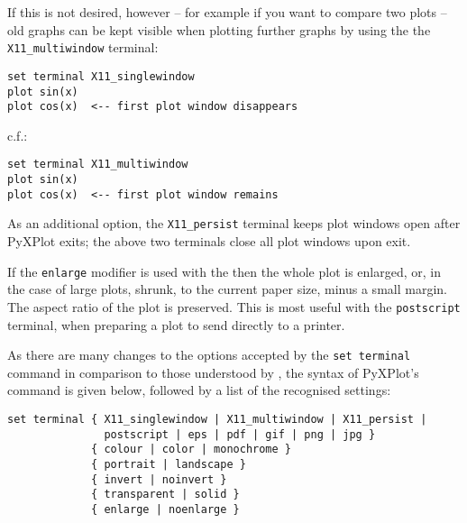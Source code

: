 If this is not desired, however -- for example if you want to compare two plots
-- old graphs can be kept visible when plotting further graphs by using the the
{\tt X11\_multiwindow} terminal:

\begin{verbatim} 
set terminal X11_singlewindow
plot sin(x)
plot cos(x)  <-- first plot window disappears
\end{verbatim}

\noindent c.f.:

\begin{verbatim} 
set terminal X11_multiwindow
plot sin(x)
plot cos(x)  <-- first plot window remains
\end{verbatim}

As an additional option, the {\tt X11\_persist} terminal keeps plot windows
open after PyXPlot exits; the above two terminals close all plot windows upon
exit.

If the {\tt enlarge} modifier is used with the  then the
whole plot is enlarged, or, in the case of large plots, shrunk, to the current
paper size, minus a small margin. The aspect ratio of the plot is preserved.
This is most useful with the {\tt postscript} terminal, when preparing a plot
to send directly to a printer.

As there are many changes to the options accepted by the {\tt set terminal}
command in comparison to those understood by \gnuplot, the syntax of PyXPlot's
command is given below, followed by a list of the recognised settings:

\begin{verbatim} 
set terminal { X11_singlewindow | X11_multiwindow | X11_persist |
               postscript | eps | pdf | gif | png | jpg }
             { colour | color | monochrome }
             { portrait | landscape }
             { invert | noinvert }
             { transparent | solid }
             { enlarge | noenlarge }
\end{verbatim}

